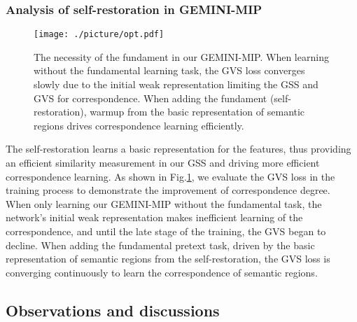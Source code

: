 \subsubsection{Analysis of self-restoration in GEMINI-MIP}
\label{subsubsec:analysisiofrestor}
\begin{figure}
  \centering
  \texttt{[image: ./picture/opt.pdf]}
  \caption{The necessity of the fundament in our GEMINI-MIP. When learning without the fundamental learning task, the GVS loss converges slowly due to the initial weak representation limiting the GSS and GVS for correspondence. When adding the fundament (self-restoration), warmup from the basic representation of semantic regions drives correspondence learning efficiently.}\label{Fig:opt}
\end{figure}
The self-restoration learns a basic representation for the features, thus providing an efficient similarity measurement in our GSS and driving more efficient correspondence learning. As shown in Fig.\ref{Fig:opt}, we evaluate the GVS loss in the training process to demonstrate the improvement of correspondence degree. When only learning our GEMINI-MIP without the fundamental task, the network’s initial weak representation makes inefficient learning of the correspondence, and until the late stage of the training, the GVS began to decline. When adding the fundamental pretext task, driven by the basic representation of semantic regions from the self-restoration, the GVS loss is converging continuously to learn the correspondence of semantic regions.

\subsection{Observations and discussions}
